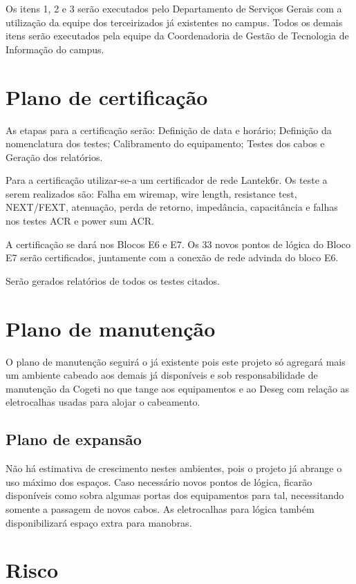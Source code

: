 \documentclass[	DIV=calc,
							paper=a4,
							fontsize=12pt,
							onecolumn]{scrartcl}
\begin{document}
Os itens 1, 2 e 3 serão executados pelo Departamento de Serviços Gerais com a utilização da equipe dos terceirizados já existentes no campus.
Todos os demais itens serão executados pela equipe da Coordenadoria de Gestão de Tecnologia de Informação do campus.

\section{Plano de certificação}
As etapas para a certificação serão:
Definição de data e horário; Definição da nomenclatura dos testes; Calibramento do equipamento; Testes dos cabos e Geração dos relatórios.

Para a certificação utilizar-se-a um certificador de rede Lantek6r. Os teste a serem realizados são:
Falha em wiremap,
wire length, resistance test, NEXT/FEXT, atenuação, perda de retorno, impedância, capacitância e falhas nos testes ACR e power sum ACR.

A certificação se dará nos Blocos E6 e E7. Os 33 novos pontos de lógica do Bloco E7 serão certificados, juntamente com a conexão de rede advinda do bloco E6.

Serão gerados relatórios de todos os testes citados.


\section{Plano de manutenção}

O plano de manutenção seguirá o já existente pois este projeto só agregará mais um ambiente cabeado aos demais já disponíveis e sob responsabilidade de manutenção da Cogeti no que tange aos equipamentos e ao Deseg com relação as eletrocalhas usadas para alojar o cabeamento.

\subsection{Plano de expansão}

Não há estimativa de crescimento nestes ambientes, pois o projeto já abrange o uso máximo dos espaços. Caso necessário novos pontos de lógica, ficarão disponíveis como sobra algumas portas dos equipamentos para tal, necessitando somente a passagem de novos cabos. As eletrocalhas para lógica também disponibilizará espaço extra para manobras.

\section{Risco}
\end{document}
